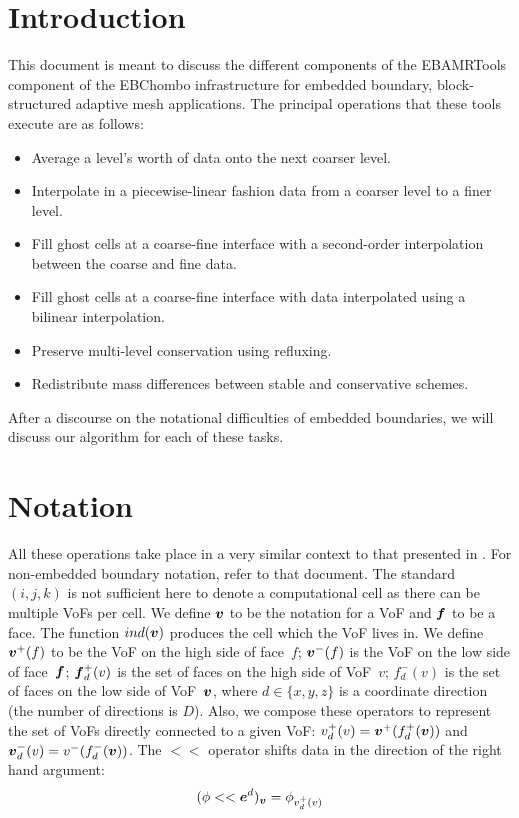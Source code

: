 
\section{Introduction}

This document is meant to discuss the different components of the
EBAMRTools component of the EBChombo infrastructure for embedded
boundary, block-structured adaptive mesh  applications.  The principal
operations that these tools execute are as follows:
\begin{itemize}
\item Average a level's worth of data onto the next coarser level.
\item Interpolate in a piecewise-linear fashion data from a coarser
      level to a finer level.
\item Fill ghost cells at a coarse-fine interface with a second-order
        interpolation between the coarse and fine data.
\item Fill ghost cells at a coarse-fine interface with data
        interpolated using a bilinear interpolation.
\item Preserve multi-level conservation using refluxing.
\item Redistribute mass differences between stable and conservative
schemes. 
\end{itemize}
After a discourse on the notational difficulties of embedded
boundaries, we will discuss our algorithm for each of these tasks.

\section{Notation}

All these operations take place in a very similar context to
that presented in \cite{ChomboDesign}.  For non-embedded boundary
notation, refer to that document. 
The standard $(i,j,k)$ is not sufficient here to denote a
computational cell as there can be multiple VoFs per cell.
We define ${\boldsymbol{v}}$ to be the notation for a VoF and ${\boldsymbol{f}}$
to be a face. The function $ind({\boldsymbol{v}})$ produces the 
cell which the VoF lives in.  We define ${\boldsymbol{v}}^+(f)$ to be the
VoF on the high side of face~$f$; ${\boldsymbol{v}}^-(f)$ is the VoF on the low side
of face~${\boldsymbol{f}}$; ${\boldsymbol{f}}^+_d(v)$ is the set of faces on the high side of
VoF~$v$; $f^-_d(v)$ is the set of faces on the low side of VoF~${\boldsymbol{v}}$,
where $d\in\{x,y,z\}$ is a coordinate direction (the number of
directions is $D$).  Also, we compose these operators to represent the
set of VoFs directly connected to a given VoF:  $v^+_d(v) =
{\boldsymbol{v}}^+(f^+_d({\boldsymbol{v}}))$ and ${\boldsymbol{v}}^-_d(v) = v^-(f^-_d({\boldsymbol{v}}))$.
The $<<$ operator shifts data in the direction of the right hand argument:
\begin{equation}
(\phi << {\boldsymbol{e}}^d)_{\boldsymbol{v}} =  \phi_{v^+_d(v)}
\end{equation}

